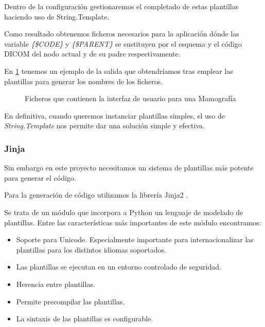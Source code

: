 Dentro de la configuración gestionaremos el completado de estas plantillas haciendo uso de String.Template.\par
Como resultado obtenemos ficheros necesarios para la aplicación dónde las variable \emph{\{\$CODE\}} y \emph{\{\$PARENT\}} se sustituyen por el esquema y el código DICOM del nodo actual y de su padre respectivamente.\par
En \ref{tree:layoutTemplate} tenemos un ejemplo de la salida que obtendríamos tras emplear las plantillas para generar los  nombres de los ficheros.\par

\begin{figure}

\centering
{}
\caption{Ficheros que contienen la interfaz de usuario para una Mamografía}
\label{tree:layoutTemplate}
\end{figure}
En definitiva, cuando queremos instanciar plantillas simples, el uso de \emph{String.Template} nos permite dar una solución simple y efectiva.\par

\subsubsection{Jinja}\label{sec:jinja}
Sin embargo en este proyecto necesitamos un sistema de plantillas más potente para generar el código.\medskip\par
Para la generación de código utilizamos la librería Jinja2 \cite{jinja}.\par 
Se trata de un módulo que incorpora a Python un lenguaje de modelado de plantillas. Entre las características más importantes de este módulo encontramos:
\begin{itemize}
\item Soporte para Unicode. Especialmente importante para internacionalizar las plantillas para los distintos idiomas soportados.
\item Las plantillas se ejecutan en un entorno controlado de seguridad.
\item Herencia entre plantillas.
\item Permite precompilar las plantillas. 
\item La sintaxis de las plantillas es configurable.  
\end{itemize}

